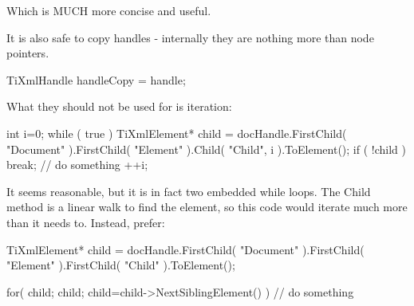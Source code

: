 \-Which is \-M\-U\-C\-H more concise and useful.

\-It is also safe to copy handles -\/ internally they are nothing more than node pointers. \begin{DoxyVerb}
	TiXmlHandle handleCopy = handle;
	\end{DoxyVerb}


\-What they should not be used for is iteration\-:

\begin{DoxyVerb}
	int i=0; 
	while ( true )
	{
		TiXmlElement* child = docHandle.FirstChild( "Document" ).FirstChild( "Element" ).Child( "Child", i ).ToElement();
		if ( !child )
			break;
		// do something
		++i;
	}
	\end{DoxyVerb}


\-It seems reasonable, but it is in fact two embedded while loops. \-The \-Child method is a linear walk to find the element, so this code would iterate much more than it needs to. \-Instead, prefer\-:

\begin{DoxyVerb}
	TiXmlElement* child = docHandle.FirstChild( "Document" ).FirstChild( "Element" ).FirstChild( "Child" ).ToElement();

	for( child; child; child=child->NextSiblingElement() )
	{
		// do something
	}
	\end{DoxyVerb}
 

